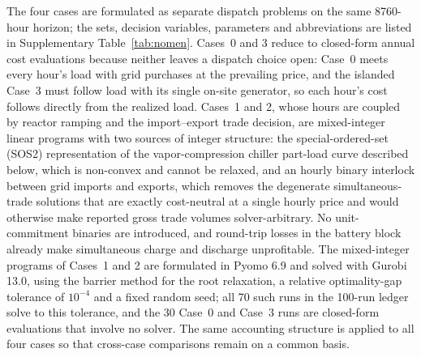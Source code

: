\documentclass[sn-vancouver,Numbered]{sn-jnl}%
\begin{document}
The four cases are formulated as separate dispatch problems on the same 8760-hour horizon; the sets, decision variables, parameters and abbreviations are listed in Supplementary Table~\ref{tab:nomen}. Cases~0 and 3 reduce to closed-form annual cost evaluations because neither leaves a dispatch choice open: Case~0 meets every hour's load with grid purchases at the prevailing price, and the islanded Case~3 must follow load with its single on-site generator, so each hour's cost follows directly from the realized load. Cases~1 and 2, whose hours are coupled by reactor ramping and the import--export trade decision, are mixed-integer linear programs with two sources of integer structure: the special-ordered-set (SOS2) representation of the vapor-compression chiller part-load curve described below, which is non-convex and cannot be relaxed, and an hourly binary interlock between grid imports and exports, which removes the degenerate simultaneous-trade solutions that are exactly cost-neutral at a single hourly price and would otherwise make reported gross trade volumes solver-arbitrary. No unit-commitment binaries are introduced, and round-trip losses in the battery block already make simultaneous charge and discharge unprofitable. The mixed-integer programs of Cases~1 and 2 are formulated in Pyomo 6.9 and solved with Gurobi 13.0, using the barrier method for the root relaxation, a relative optimality-gap tolerance of $10^{-4}$ and a fixed random seed; all 70 such runs in the 100-run ledger solve to this tolerance, and the 30 Case~0 and Case~3 runs are closed-form evaluations that involve no solver. The same accounting structure is applied to all four cases so that cross-case comparisons remain on a common basis.
\end{document}
